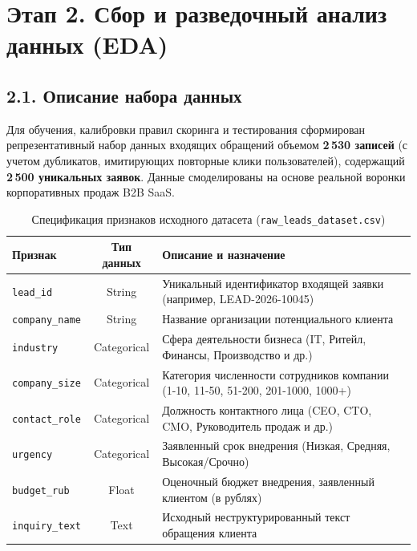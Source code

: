 \documentclass[12pt,a4paper]{article}
\begin{document}
	\section*{Этап 2. Сбор и разведочный анализ данных (EDA)}
	
	\subsection*{2.1. Описание набора данных}
	Для обучения, калибровки правил скоринга и тестирования сформирован репрезентативный набор данных входящих обращений объемом \textbf{2\,530 записей} (с учетом дубликатов, имитирующих повторные клики пользователей), содержащий \textbf{2\,500 уникальных заявок}. Данные смоделированы на основе реальной воронки корпоративных продаж B2B SaaS.

	\begin{table}[H]
		\centering
		\small
		\caption{Спецификация признаков исходного датасета (\texttt{raw\_leads\_dataset.csv})}
		\begin{tabularx}{\textwidth}{|l|c|X|}
			\hline
			\textbf{Признак} & \textbf{Тип данных} & \textbf{Описание и назначение} \\
			\hline
			\texttt{lead\_id} & String & Уникальный идентификатор входящей заявки (например, LEAD-2026-10045) \\
			\hline
			\texttt{company\_name} & String & Название организации потенциального клиента \\
			\hline
			\texttt{industry} & Categorical & Сфера деятельности бизнеса (IT, Ритейл, Финансы, Производство и др.) \\
			\hline
			\texttt{company\_size} & Categorical & Категория численности сотрудников компании (1-10, 11-50, 51-200, 201-1000, 1000+) \\
			\hline
			\texttt{contact\_role} & Categorical & Должность контактного лица (CEO, CTO, CMO, Руководитель продаж и др.) \\
			\hline
			\texttt{urgency} & Categorical & Заявленный срок внедрения (Низкая, Средняя, Высокая/Срочно) \\
			\hline
			\texttt{budget\_rub} & Float & Оценочный бюджет внедрения, заявленный клиентом (в рублях) \\
			\hline
			\texttt{inquiry\_text} & Text & Исходный неструктурированный текст обращения клиента \\
			\hline
		\end{tabularx}
	\end{table}
\end{document}
